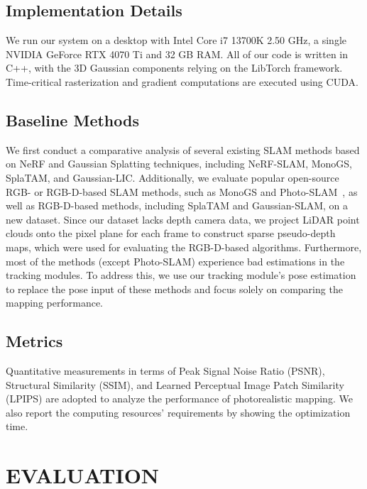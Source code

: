 \documentclass[lettersize,journal]{IEEEtran}
\begin{document}
\subsection{Implementation Details}
We run our system on a desktop with Intel Core i7 13700K 2.50 GHz, a single NVIDIA GeForce RTX 4070 Ti and 32 GB RAM.  All of our code is written in C++, with the 3D Gaussian components relying on the LibTorch framework. Time-critical rasterization and gradient computations are executed using CUDA.

\subsection{Baseline Methods} 
We first conduct a comparative analysis of several existing SLAM methods based on NeRF and Gaussian Splatting techniques, including NeRF-SLAM\cite{nerfslam}, MonoGS\cite{monogs}, SplaTAM\cite{splatam}, and Gaussian-LIC\cite{gaussianlic}. Additionally, we evaluate popular open-source RGB- or RGB-D-based SLAM methods, such as MonoGS\cite{monogs} and Photo-SLAM~\cite{photoslam}, as well as RGB-D-based methods, including SplaTAM\cite{splatam} and Gaussian-SLAM\cite{gaussianslam}, on a new dataset. Since our dataset lacks depth camera data, we project LiDAR point clouds onto the pixel plane for each frame to construct sparse pseudo-depth maps, which were used for evaluating the RGB-D-based algorithms. Furthermore, most of the methods (except Photo-SLAM) experience bad estimations in the tracking modules. To address this, we use our tracking module's pose estimation to replace the pose input of these methods and focus solely on comparing the mapping performance.

\subsection{Metrics}
\label{subsec:metrics}
Quantitative measurements in terms of Peak Signal Noise Ratio (PSNR), Structural Similarity (SSIM), and Learned Perceptual Image Patch Similarity (LPIPS) are adopted to analyze the performance of photorealistic mapping. We also report the computing resources' requirements by showing the optimization time.

\section{EVALUATION}
\end{document}

